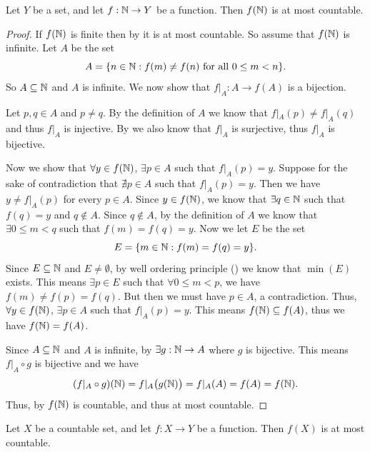 \begin{prop}\label{i:8.1.8}
  Let \(Y\) be a set, and let \(f : \mathbb{N} \to Y\) be a function.
  Then \(f(\mathbb{N})\) is at most countable.
\end{prop}

\begin{proof}
  If \(f(\mathbb{N})\) is finite then by  it is at most countable.
  So assume that \(f(\mathbb{N})\) is infinite.
  Let \(A\) be the set
  \[
    A = \set{n \in \N : f(m) \neq f(n) \text{ for all } 0 \leq m < n}.
  \]
  So \(A \subseteq \mathbb{N}\) and \(A\) is infinite.
  We now show that \(f|_A : A \to f(A)\) is a bijection.

  Let \(p, q \in A\) and \(p \neq q\).
  By the definition of \(A\) we know that \(f|_A(p) \neq f|_A(q)\) and thus \(f|_A\) is injective.
  By  we also know that \(f|_A\) is surjective, thus \(f|_A\) is bijective.

  Now we show that \(\forall y \in f(\mathbb{N})\), \(\exists p \in A\) such that \(f|_A(p) = y\).
  Suppose for the sake of contradiction that \(\nexists p \in A\) such that \(f|_A(p) = y\).
  Then we have \(y \neq f|_A(p)\) for every \(p \in A\).
  Since \(y \in f(\mathbb{N})\), we know that \(\exists q \in \mathbb{N}\) such that \(f(q) = y\) and \(q \notin A\).
  Since \(q \notin A\), by the definition of \(A\) we know that \(\exists 0 \leq m < q\) such that \(f(m) = f(q) = y\).
  Now we let \(E\) be the set
  \[
    E = \set{m \in \N : f(m) = f(q) = y}.
  \]
  Since \(E \subseteq \mathbb{N}\) and \(E \neq \emptyset\), by well ordering principle () we know that \(\min(E)\) exists.
  This means \(\exists p \in E\) such that \(\forall 0 \leq m < p\), we have \(f(m) \neq f(p) = f(q)\).
  But then we must have \(p \in A\), a contradiction.
  Thus, \(\forall y \in f(\mathbb{N})\), \(\exists p \in A\) such that \(f|_A(p) = y\).
  This means \(f(\mathbb{N}) \subseteq f(A)\), thus we have \(f(\mathbb{N}) = f(A)\).

  Since \(A \subseteq \mathbb{N}\) and \(A\) is infinite, by  \(\exists g : \mathbb{N} \to A\) where \(g\) is bijective.
  This means \(f|_A \circ g\) is bijective and we have
  \[
    (f|_A \circ g)(\mathbb{N}) = f|_A\big(g(\mathbb{N})\big) = f|_A(A) = f(A) = f(\mathbb{N}).
  \]
  Thus, by  \(f(\mathbb{N})\) is countable, and thus at most countable.
\end{proof}

\begin{cor}\label{i:8.1.9}
  Let \(X\) be a countable set, and let \(f : X \to Y\) be a function.
  Then \(f(X)\) is at most countable.
\end{cor}

